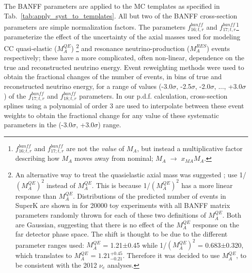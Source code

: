 The BANFF parameters are applied to the MC templates as specified in Tab.\ \ref{tab:apply_syst_to_templates}.
All but two of the BANFF cross-section parameters are simple normalization factors.
The parameters $f_{16; t, r}^{banff}$ and $f_{17; t, r}^{banff}$\footnote{
  $f_{16; t, r}^{banff}$ and $f_{17; t, r}^{banff}$ are not the \emph{value} of $M_{A}$, but
  instead a multiplicative factor describing how $M_{A}$ moves away from
  nominal; $M_A$ $\rightarrow$ $x_{MA} M_A$.
} parameterize
the effect of the uncertainty of the axial masses used for modeling CC quasi-elastic 
($M_{A}^{QE}$) 
\footnote{
  An alternative way to treat the quasielastic axial mass was suggested \cite{1overMAQE2}; use 1/$(M_{A}^{QE})^2$ instead of $M_{A}^{QE}$. 
  This is because 1/$(M_{A}^{QE})^2$ has a more linear response than $M_{A}^{QE}$. Distributions of the predicted number of events in SuperK 
  are shown in \cite{Tom1overMaQE2} for 20000 toy experiments with all BANFF matrix parameters randomly thrown for each of these two
  definitions of $M_{A}^{QE}$. Both are Gaussian, suggesting that there is no 
  effect of the $M_{A}^{QE}$ response on the far detector phase space. The shift is thought to be due to the different parameter ranges used: 
  $M_{A}^{QE}$ = 1.21$\pm$0.45 while 1/$(M_{A}^{QE})^2$ = 0.683$\pm$0.320, which translates to $M_{A}^{QE}$ = $1.21^{+0.45}_{−0.21}$. 
  Therefore it was decided to use $M_{A}^{QE}$, to be consistent with the 2012 $\nu_e$ analyses.
} and 
resonance neutrino-production ($M_{A}^{RES}$) 
events respectively;
these have a more complicated, often non-linear, dependence on the true and reconstructed neutrino energy.
Event reweighting methods were used to obtain the fractional changes of the number of events, 
in bins of true and reconstructed neutrino energy, for a range of values (-3.0$\sigma$, -2.5$\sigma$, -2.0$\sigma$, ..., +3.0$\sigma$)
of the $f_{17; t, r}^{banff}$ and $f_{18; t, r}^{banff}$ parameters.
In our p.d.f. calculation, cross-section splines using a polynomial of order 3 are used to interpolate between these event weights 
to obtain the fractional change for any value of these systematic parameters in the (-3.0$\sigma$, +3.0$\sigma$) range.


